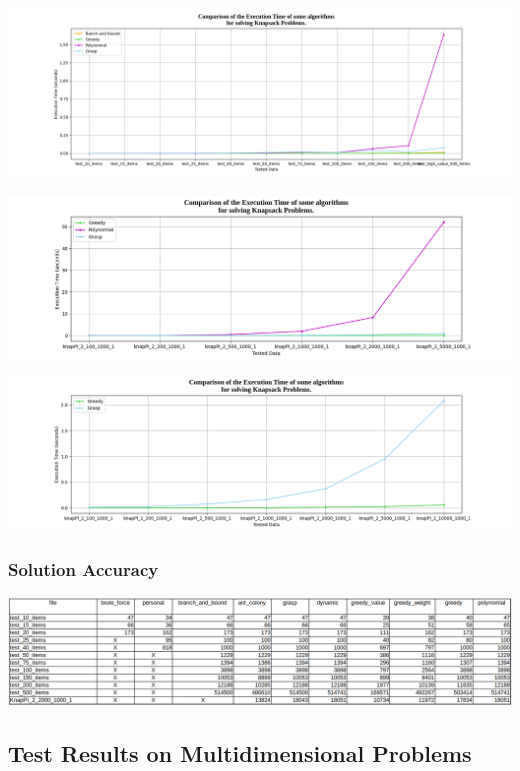 \documentclass[a4paper, 11pt]{article}
\begin{document}
            \includegraphics[scale = 0.4]{graph_bests.png}

            \includegraphics[scale = 0.5]{graph_high_numbers.png}

            \includegraphics[scale = 0.5]{graph_best_high_numbers.png}
        \subsubsection{Solution Accuracy}


            \includegraphics[scale = 0.45]{values_0-1.png}

    \subsection{Test Results on Multidimensional Problems}
\end{document}
